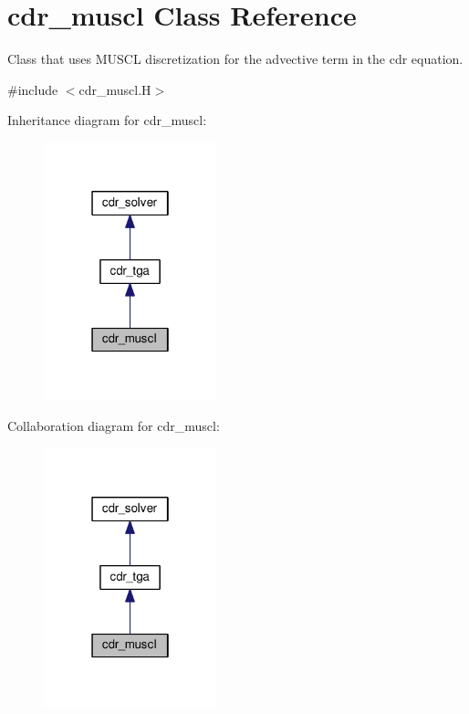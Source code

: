 \hypertarget{classcdr__muscl}{}\section{cdr\+\_\+muscl Class Reference}
\label{classcdr__muscl}


Class that uses M\+U\+S\+CL discretization for the advective term in the cdr equation.  




{\ttfamily \#include $<$cdr\+\_\+muscl.\+H$>$}



Inheritance diagram for cdr\+\_\+muscl\+:\nopagebreak
\begin{figure}[H]
\begin{center}
\leavevmode
\includegraphics[width=142pt]{classcdr__muscl__inherit__graph}
\end{center}
\end{figure}


Collaboration diagram for cdr\+\_\+muscl\+:\nopagebreak
\begin{figure}[H]
\begin{center}
\leavevmode
\includegraphics[width=142pt]{classcdr__muscl__coll__graph}
\end{center}
\end{figure}
